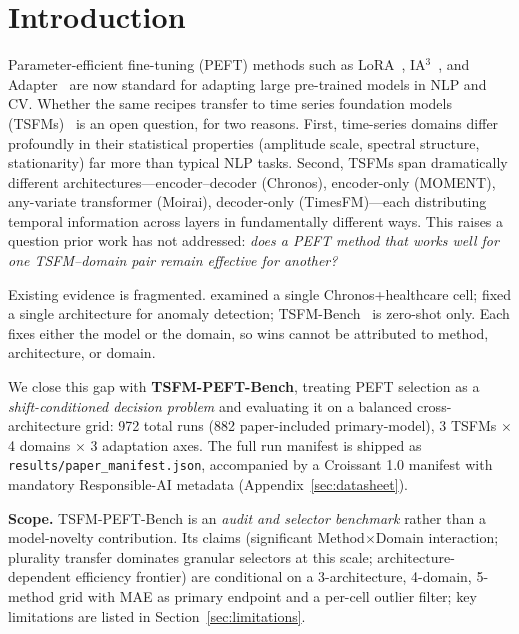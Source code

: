 \documentclass{article}
\begin{document}
\section{Introduction}

Parameter-efficient fine-tuning (PEFT) methods such as LoRA~\citep{hu2022lora}, IA$^3$~\citep{liu2022ia3}, and Adapter~\citep{houlsby2019adapter} are now standard for adapting large pre-trained models in NLP and CV. Whether the same recipes transfer to time series foundation models (TSFMs)~\citep{ansari2024chronos,goswami2024moment,woo2024moirai,das2024timesfm} is an open question, for two reasons. First, time-series domains differ profoundly in their statistical properties (amplitude scale, spectral structure, stationarity) far more than typical NLP tasks. Second, TSFMs span dramatically different architectures---encoder--decoder (Chronos), encoder-only (MOMENT), any-variate transformer (Moirai), decoder-only (TimesFM)---each distributing temporal information across layers in fundamentally different ways. This raises a question prior work has not addressed: \emph{does a PEFT method that works well for one TSFM--domain pair remain effective for another?}

Existing evidence is fragmented. \citet{gupta2024beyondlora} examined a single Chronos+healthcare cell; \citet{park2026tsfm_adaptation} fixed a single architecture for anomaly detection; TSFM-Bench~\citep{li2024tsfmbench} is zero-shot only. Each fixes either the model or the domain, so wins cannot be attributed to method, architecture, or domain.

We close this gap with \textbf{TSFM-PEFT-Bench}, treating PEFT selection as a \emph{shift-conditioned decision problem} and evaluating it on a balanced cross-architecture grid: 972 total runs (882 paper-included primary-model), 3 TSFMs $\times$ 4 domains $\times$ 3 adaptation axes. The full run manifest is shipped as \texttt{results/paper\_manifest.json}, accompanied by a Croissant 1.0 manifest with mandatory Responsible-AI metadata (Appendix~\ref{sec:datasheet}).

\textbf{Scope.} TSFM-PEFT-Bench is an \emph{audit and selector benchmark} rather than a model-novelty contribution. Its claims (significant Method$\times$Domain interaction; plurality transfer dominates granular selectors at this scale; architecture-dependent efficiency frontier) are conditional on a 3-architecture, 4-domain, 5-method grid with MAE as primary endpoint and a per-cell outlier filter; key limitations are listed in Section~\ref{sec:limitations}.
\end{document}
